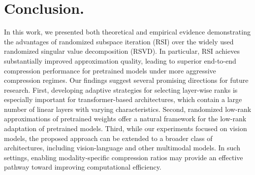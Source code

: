 \documentclass[twoside,leqno,onecolumn]{article}
\begin{document}
\section{Conclusion.}
In this work, we presented both theoretical and empirical evidence demonstrating the advantages of randomized subspace iteration (RSI) over the widely used randomized singular value decomposition (RSVD). In particular, RSI achieves substantially improved approximation quality, leading to superior end-to-end compression performance for pretrained models under more aggressive compression regimes. Our findings suggest several promising directions for future research. First, developing adaptive strategies for selecting layer-wise ranks is especially important for transformer-based architectures, which contain a large number of linear layers with varying characteristics. Second, randomized low-rank approximations of pretrained weights offer a natural framework for the low-rank adaptation of pretrained models. Third, while our experiments focused on vision models, the proposed approach can be extended to a broader class of architectures, including vision-language and other multimodal models. In such settings, enabling modality-specific compression ratios may provide an effective pathway toward improving computational efficiency.




\end{document}
